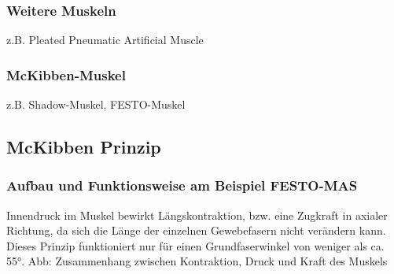 \subsubsection{Weitere Muskeln}
z.B. Pleated Pneumatic Artificial Muscle
\subsubsection{McKibben-Muskel}
z.B. Shadow-Muskel, FESTO-Muskel
\subsection{McKibben Prinzip}
\subsubsection{Aufbau und Funktionsweise am Beispiel FESTO-MAS}
Innendruck im Muskel bewirkt Längskontraktion, bzw. eine Zugkraft in axialer Richtung, da sich die Länge der einzelnen Gewebefasern nicht verändern kann. Dieses Prinzip funktioniert nur für einen Grundfaserwinkel von weniger als ca. 55°.
Abb: Zusammenhang zwischen Kontraktion, Druck und Kraft des Muskels
